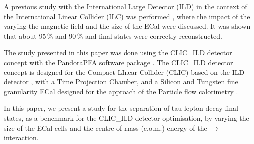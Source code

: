 \documentclass[a4paper,11pt]{article}
\begin{document}

A previous study with the International Large Detector (ILD) in the context of the International Linear Collider (ILC) was performed \cite{Tran2016}, where the impact of the varying the magnetic field and the size of the ECal were discussed. It was shown that about 95\,\% \Ppiminus\Pnut and 90\,\% \Prhominus\Pnut and \Pai\Pnut final states were correctly reconstructed.





The study presented in this paper was done using the CLIC\_ILD detector concept with the PandoraPFA software package . The CLIC\_ILD detector concept \cite{Linssen:2012hp} is designed for the Compact LInear Collider (CLIC) based on the ILD detector \cite{Abe:2010aa}, with a Time Projection Chamber, and a Silicon and Tungsten fine granularity ECal designed for the approach of the Particle flow calorimetry \cite{Marshall:2012ry}.



In this paper, we present a study for the separation of tau lepton decay final states, as a benchmark for the CLIC\_ILD detector optimisation, by varying the size of the ECal cells and the centre of mass (c.o.m.) energy of the \Pelectron\APelectron $\to$ \Ptauon\APtauon interaction.
\end{document}
